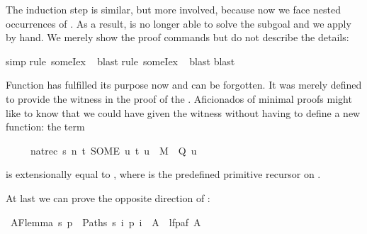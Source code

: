 \begin{isabellebody}
\begin{isamarkuptxt}
The induction step is similar, but more involved, because now we face nested
occurrences of . As a result,  is no longer able to
solve the subgoal and we apply  by hand.  We merely
show the proof commands but do not describe the details:%
\end{isamarkuptxt}%
\isamarkuptrue%
\isamarkupfalse%
{\isacharparenleft}simp{\isacharparenright}\isanewline
{}\isamarkupfalse%
{\isacharparenleft}rule\ someI{}{\isacharunderscore}ex{\isacharparenright}\isanewline
\ \isamarkupfalse%
{\isacharparenleft}blast{\isacharparenright}\isanewline
{}\isamarkupfalse%
{\isacharparenleft}rule\ someI{}{\isacharunderscore}ex{\isacharparenright}\isanewline
\ \isamarkupfalse%
{\isacharparenleft}blast{\isacharparenright}\isanewline
{}\isamarkupfalse%
{\isacharparenleft}blast{\isacharparenright}\isanewline
{}\isamarkupfalse%
%
\endisatagproof
{\isafoldproof}%
%
\isadelimproof
%
\endisadelimproof
%
\begin{isamarkuptext}%
Function  has fulfilled its purpose now and can be forgotten.
It was merely defined to provide the witness in the proof of the
. Aficionados of minimal proofs might like to know
that we could have given the witness without having to define a new function:
the term
\begin{isabelle}%
\ \ \ \ \ nat{\isacharunderscore}rec\ s\ {\isacharparenleft}{\isasymlambda}n\ t{\isachardot}\ SOME\ u{\isachardot}\ {\isacharparenleft}t{\isacharcomma}\ u{\isacharparenright}\ {\isasymin}\ M\ {\isasymand}\ Q\ u{\isacharparenright}%
\end{isabelle}
is extensionally equal to ,
where  is the predefined primitive recursor on .%
\end{isamarkuptext}%
\isamarkuptrue%
%
\isadelimproof
%
\endisadelimproof
%
\isatagproof
%
\endisatagproof
{\isafoldproof}%
%
\isadelimproof
%
\endisadelimproof
%
\begin{isamarkuptext}%
At last we can prove the opposite direction of :%
\end{isamarkuptext}%
\isamarkuptrue%
\isamarkupfalse%
\ AF{\isacharunderscore}lemma{}{\isacharcolon}\ {\isachardoublequoteopen}{\isacharbraceleft}s{\isachardot}\ {\isasymforall}p\ {\isasymin}\ Paths\ s{\isachardot}\ {\isasymexists}i{\isachardot}\ p\ i\ {\isasymin}\ A{\isacharbraceright}\ {\isasymsubseteq}\ lfp{\isacharparenleft}af\ A{\isacharparenright}{\isachardoublequoteclose}%

\end{isabellebody}
